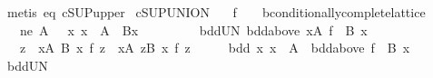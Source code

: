 \begin{isabellebody}
\isamarkupfalse%
\ {\isacharparenleft}{\kern0pt}metis\ eq\ cSUP{\isacharunderscore}{\kern0pt}upper{\isacharparenright}{\kern0pt}\isanewline
{}\isamarkupfalse%
%
\endisatagproof
{\isafoldproof}%
%
\isadelimproof
\isanewline
%
\endisadelimproof
\isanewline
{}\isamarkupfalse%
\ cSUP{\isacharunderscore}{\kern0pt}UNION{\isacharcolon}{\kern0pt}\isanewline
\ \ \ f\ {\isacharcolon}{\kern0pt}{\isacharcolon}{\kern0pt}\ {\isachardoublequoteopen}{\isacharunderscore}{\kern0pt}\ {\isasymRightarrow}\ {\isacharprime}{\kern0pt}b{\isacharcolon}{\kern0pt}{\isacharcolon}{\kern0pt}conditionally{\isacharunderscore}{\kern0pt}complete{\isacharunderscore}{\kern0pt}lattice{\isachardoublequoteclose}\isanewline
\ \ \ ne{\isacharcolon}{\kern0pt}\ {\isachardoublequoteopen}A\ {\isasymnoteq}\ {\isacharbraceleft}{\kern0pt}{\isacharbraceright}{\kern0pt}{\isachardoublequoteclose}\ {\isachardoublequoteopen}{\isasymAnd}x{\isachardot}{\kern0pt}\ x\ {\isasymin}\ A\ {\isasymLongrightarrow}\ B{\isacharparenleft}{\kern0pt}x{\isacharparenright}{\kern0pt}\ {\isasymnoteq}\ {\isacharbraceleft}{\kern0pt}{\isacharbraceright}{\kern0pt}{\isachardoublequoteclose}\isanewline
\ \ \ \ \ \ \ bdd{\isacharunderscore}{\kern0pt}UN{\isacharcolon}{\kern0pt}\ {\isachardoublequoteopen}bdd{\isacharunderscore}{\kern0pt}above\ {\isacharparenleft}{\kern0pt}{\isasymUnion}x{\isasymin}A{\isachardot}{\kern0pt}\ f\ {\isacharbackquote}{\kern0pt}\ B\ x{\isacharparenright}{\kern0pt}{\isachardoublequoteclose}\isanewline
\ \ \ {\isachardoublequoteopen}{\isacharparenleft}{\kern0pt}{\isasymSqunion}z\ {\isasymin}\ {\isasymUnion}x{\isasymin}A{\isachardot}{\kern0pt}\ B\ x{\isachardot}{\kern0pt}\ f\ z{\isacharparenright}{\kern0pt}\ {\isacharequal}{\kern0pt}\ {\isacharparenleft}{\kern0pt}{\isasymSqunion}x{\isasymin}A{\isachardot}{\kern0pt}\ {\isasymSqunion}z{\isasymin}B\ x{\isachardot}{\kern0pt}\ f\ z{\isacharparenright}{\kern0pt}{\isachardoublequoteclose}\isanewline
%
\isadelimproof
%
\endisadelimproof
%
\isatagproof
{}\isamarkupfalse%
\ {\isacharminus}{\kern0pt}\isanewline
\ \ \isamarkupfalse%
\ bdd{\isacharcolon}{\kern0pt}\ {\isachardoublequoteopen}{\isasymAnd}x{\isachardot}{\kern0pt}\ x\ {\isasymin}\ A\ {\isasymLongrightarrow}\ bdd{\isacharunderscore}{\kern0pt}above\ {\isacharparenleft}{\kern0pt}f\ {\isacharbackquote}{\kern0pt}\ B\ x{\isacharparenright}{\kern0pt}{\isachardoublequoteclose}\isanewline
\ \ \ \ \isamarkupfalse%
\ bdd{\isacharunderscore}{\kern0pt}UN\ \isamarkupfalse%

\end{isabellebody}
